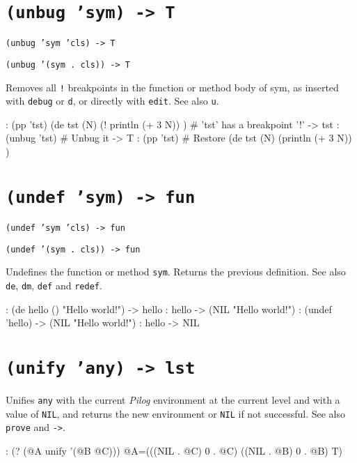  
\section*{\texttt{(unbug 'sym) -> T}}
\label{sec:func-ref-U-(unbug 'sym) -> T}


\texttt{(unbug 'sym 'cls) -> T}

\texttt{(unbug '(sym . cls)) -> T}

Removes all \texttt{!} breakpoints in the function or method body of sym, as
inserted with \texttt{debug} or \texttt{d}, or directly with \texttt{edit}. See also \texttt{u}.


\begin{wideverbatim}
: (pp 'tst)
(de tst (N)
   (! println (+ 3 N)) )         # 'tst' has a breakpoint '!'
-> tst
: (unbug 'tst)                   # Unbug it
-> T
: (pp 'tst)                      # Restore
(de tst (N)
   (println (+ 3 N)) )
\end{wideverbatim}

 
\section*{\texttt{(undef 'sym) -> fun}}
\label{sec:func-ref-U-(undef 'sym) -> fun}


\texttt{(undef 'sym 'cls) -> fun}

\texttt{(undef '(sym . cls)) -> fun}

Undefines the function or method \texttt{sym}. Returns the previous definition.
See also \texttt{de}, \texttt{dm}, \texttt{def} and \texttt{redef}.


\begin{wideverbatim}
: (de hello () "Hello world!")
-> hello
: hello
-> (NIL "Hello world!")
: (undef 'hello)
-> (NIL "Hello world!")
: hello
-> NIL
\end{wideverbatim}

 
\section*{\texttt{(unify 'any) -> lst}}
\label{sec:func-ref-U-(unify 'any) -> lst}


Unifies \texttt{any} with the current \emph{Pilog} environment at
the current level and with a value of \texttt{NIL}, and returns the new
environment or \texttt{NIL} if not successful. See also \texttt{prove} and \texttt{->}.


\begin{wideverbatim}
: (? (@A unify '(@B @C)))
 @A=(((NIL . @C) 0 . @C) ((NIL . @B) 0 . @B) T)
\end{wideverbatim}

